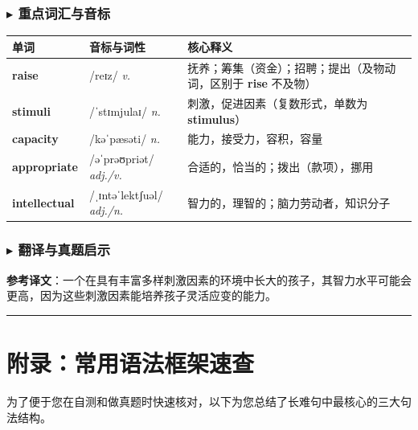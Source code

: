 \documentclass[cn,normal,11pt]{elegantnote}
\newcommand{\retrokey}[1]{{\color{accentcolor}\textbf{#1}}}
\renewcommand{\citshape}{\kaishu\fontspec{Arial}}
\begin{document}
\subsubsection*{$\blacktriangleright$ 重点词汇与音标}
\noindent
\begin{tabularx}{\textwidth}{l X p{7cm}}
  \toprule
  \textbf{单词} & \textbf{音标与词性} & \textbf{核心释义} \\
  \midrule
  \retrokey{raise} & {\citshape /reɪz/} \textit{v.} & 抚养；筹集（资金）；招聘；提出（及物动词，区别于 \textbf{rise} 不及物） \\
  \midrule
  \retrokey{stimuli} & {\citshape /ˈstɪmjulaɪ/} \textit{n.} & 刺激，促进因素（复数形式，单数为 \textbf{stimulus}） \\
  \midrule
  \retrokey{capacity} & {\citshape /kəˈpæsəti/} \textit{n.} & 能力，接受力，容积，容量 \\
  \midrule
  \retrokey{appropriate} & {\citshape /əˈprəʊpriət/} \textit{adj./v.} & 合适的，恰当的；拨出（款项），挪用 \\
  \midrule
  \retrokey{intellectual} & {\citshape /ˌɪntəˈlektʃuəl/} \textit{adj./n.} & 智力的，理智的；脑力劳动者，知识分子 \\
  \bottomrule
\end{tabularx}

\subsubsection*{$\blacktriangleright$ 翻译与真题启示}
\begin{remark}
  \textbf{参考译文}：一个在具有丰富多样刺激因素的环境中长大的孩子，其智力水平可能会更高，因为这些刺激因素能培养孩子灵活应变的能力。
\end{remark}

\par\vspace{20pt}\hrule\vspace{20pt}

\section*{附录：常用语法框架速查}

为了便于您在自测和做真题时快速核对，以下为您总结了长难句中最核心的三大句法结构。
\end{document}
